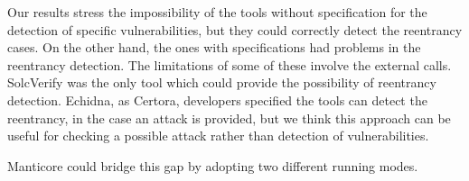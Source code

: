 Our results stress the impossibility of the tools without specification for the detection of specific vulnerabilities, but they could correctly detect the reentrancy cases. 
On the other hand, the ones with specifications had problems in the reentrancy detection. The limitations of some of these involve the external calls. 
SolcVerify was the only tool which could provide the possibility of reentrancy detection. Echidna, as Certora, developers specified the tools  can detect the reentrancy, in the case an attack is provided, 
but we think this approach can be useful for checking a possible attack rather than detection of vulnerabilities.

Manticore could bridge this gap by adopting two different running modes.

